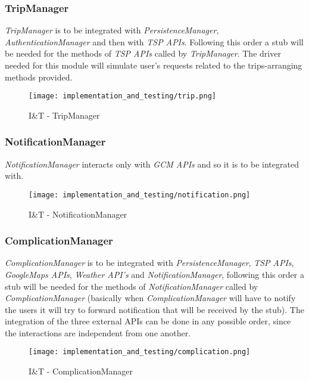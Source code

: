 \subsubsection{TripManager}
\textit{TripManager} is to be integrated with \textit{PersistenceManager}, \textit{AuthenticationManager} and then with \textit{TSP APIs}. Following this order a stub will be needed for the methods of \textit{TSP APIs} called by \textit{TripManager}. The driver needed for this module will simulate user's requests related to the trips-arranging methods provided.
\begin{figure}[H]
	\begin{center}
		\texttt{[image: implementation\_and\_testing/trip.png]}
	\end{center}
	\caption{I\&T - TripManager}
\end{figure}

\subsubsection{NotificationManager}
\textit{NotificationManager} interacts only with \textit{GCM APIs} and so it is to be integrated with.
\begin{figure}[H]
	\begin{center}
		\texttt{[image: implementation\_and\_testing/notification.png]}
	\end{center}
	\caption{I\&T - NotificationManager}
\end{figure}

\subsubsection{ComplicationManager}
\textit{ComplicationManager} is to be integrated with \textit{PersistenceManager}, \textit{TSP APIs}, \textit{GoogleMaps APIs}, \textit{Weather API's} and \textit{NotificationManager}, following this order a stub will be needed for the methods of \textit{NotificationManager} called by \textit{ComplicationManager} (basically when \textit{ComplicationManager} will have to notify the users it will try to forward notification that will be received by the stub).
The integration of the three external APIs can be done in any possible order, since the interactions are independent from one another.
\begin{figure}[H]
	\begin{center}
		\texttt{[image: implementation\_and\_testing/complication.png]}
	\end{center}
	\caption{I\&T - ComplicationManager}
\end{figure}

